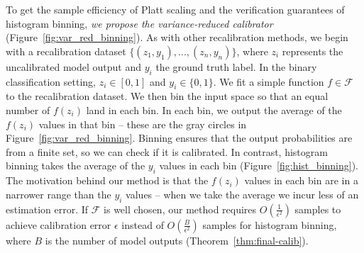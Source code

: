 To get the sample efficiency of Platt scaling and the verification guarantees of histogram binning, \emph{we propose the variance-reduced calibrator} (Figure~\ref{fig:var_red_binning}).
As with other recalibration methods, we begin with a recalibration dataset $\{(z_1, y_1), ..., (z_n, y_n)\}$, where $z_i$ represents the uncalibrated model output and $y_i$ the ground truth label.
In the binary classification setting, $z_i \in [0, 1]$ and $y_i \in \{0, 1\}$.
We fit a simple function $f \in \mathcal{F}$ to the recalibration dataset.
We then bin the input space so that an equal number of $f(z_i)$ land in each bin.
In each bin, we output the average of the $f(z_i)$ values in that bin -- these are the gray circles in Figure~\ref{fig:var_red_binning}.
Binning ensures that the output probabilities are from a finite set, so we can check if it is calibrated.
In contrast, histogram binning takes the average of the $y_i$ values in each bin (Figure~\ref{fig:hist_binning}).
The motivation behind our method is that the $f(z_i)$ values in each bin are in a narrower range than the $y_i$ values -- when we take the average we incur less of an estimation error.
If $\mathcal{F}$ is well chosen, our method requires $O(\frac{1}{\epsilon^2})$ samples to achieve calibration error $\epsilon$ instead of $O(\frac{B}{\epsilon^2})$ samples for histogram binning, where $B$ is the number of model outputs (Theorem~\ref{thm:final-calib}).


